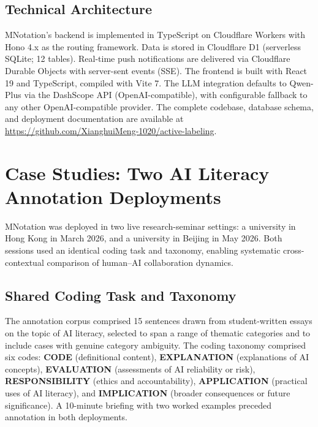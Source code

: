 \documentclass[fleqn,10pt]{JLA_article}
\begin{document}
\subsection{Technical Architecture}

MNotation's backend is implemented in TypeScript on Cloudflare Workers with Hono 4.x as
the routing framework. Data is stored in Cloudflare D1 (serverless SQLite; 12 tables).
Real-time push notifications are delivered via Cloudflare Durable Objects with
server-sent events (SSE). The frontend is built with React 19 and TypeScript, compiled
with Vite 7. The LLM integration defaults to Qwen-Plus via the DashScope API (OpenAI-compatible),
with configurable fallback to any other OpenAI-compatible provider. The complete codebase,
database schema, and deployment documentation are available at
\url{https://github.com/XianghuiMeng-1020/active-labeling}.

\section{Case Studies: Two AI Literacy Annotation Deployments}

MNotation was deployed in two live research-seminar settings: a university in Hong Kong
in March 2026, and a university in Beijing in May 2026. Both sessions used an identical
coding task and taxonomy, enabling systematic cross-contextual comparison of human--AI
collaboration dynamics.

\subsection{Shared Coding Task and Taxonomy}

The annotation corpus comprised 15 sentences drawn from student-written essays on the topic
of AI literacy, selected to span a range of thematic categories and to include cases with
genuine category ambiguity. The coding taxonomy comprised six codes:
\textbf{CODE} (definitional content), \textbf{EXPLANATION} (explanations of AI concepts),
\textbf{EVALUATION} (assessments of AI reliability or risk), \textbf{RESPONSIBILITY}
(ethics and accountability), \textbf{APPLICATION} (practical uses of AI literacy), and
\textbf{IMPLICATION} (broader consequences or future significance).
A 10-minute briefing with two worked examples preceded annotation in both deployments.
\end{document}
